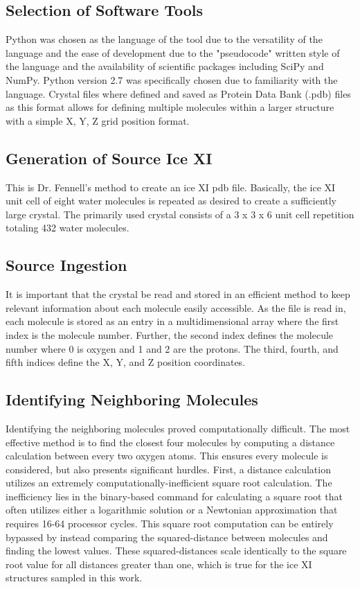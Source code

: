 \subsection{Selection of Software Tools}

Python was chosen as the language of the tool due to the versatility of the language and the ease of development due to the "pseudocode" written style of the language and the availability of scientific packages including SciPy and NumPy. 
Python version 2.7 was specifically chosen due to familiarity with the language.
Crystal files where defined and saved as Protein Data Bank (.pdb) files as this format allows for defining multiple molecules within a larger structure with a simple X, Y, Z grid position format. 

\subsection{Generation of Source Ice XI}

This is Dr. Fennell's method to create an ice XI pdb file. 
Basically, the ice XI unit cell of eight water molecules is repeated as desired to create a sufficiently large crystal.
The primarily used crystal consists of a 3 x 3 x 6 unit cell repetition totaling 432 water molecules.

\subsection{Source Ingestion}

It is important that the crystal be read and stored in an efficient method to keep relevant information about each molecule easily accessible. 
As the file is read in, each molecule is stored as an entry in a multidimensional array where the first index is the molecule number. 
Further, the second index defines the molecule number where 0 is oxygen and 1 and 2 are the protons. 
The third, fourth, and fifth indices define the X, Y, and Z position coordinates. 

\subsection{Identifying Neighboring Molecules}

Identifying the neighboring molecules proved computationally difficult. 
The most effective method is to find the closest four molecules by computing a distance calculation between every two oxygen atoms.
This ensures every molecule is considered, but also presents significant hurdles.
First, a distance calculation utilizes an extremely computationally-inefficient square root calculation.
The inefficiency lies in the binary-based command for calculating a square root that often utilizes either a logarithmic solution or a Newtonian approximation that requires 16-64 processor cycles.
This square root computation can be entirely bypassed by instead comparing the squared-distance between molecules and finding the lowest values.
These squared-distances scale identically to the square root value for all distances greater than one, which is true for the ice XI structures sampled in this work.

